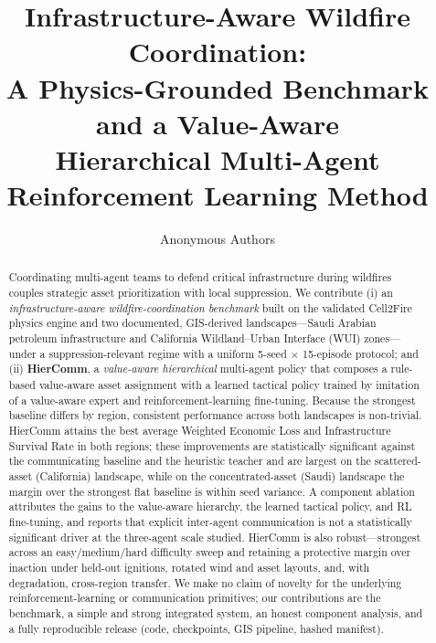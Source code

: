 \documentclass[letterpaper]{article}
\title{Infrastructure-Aware Wildfire Coordination: \\ A Physics-Grounded Benchmark and a Value-Aware \\ Hierarchical Multi-Agent Reinforcement Learning Method}
\author{Anonymous Authors}
\begin{document}
\maketitle

\begin{abstract}
Coordinating multi-agent teams to defend critical infrastructure during wildfires couples strategic asset prioritization with local suppression. We contribute (i) an \emph{infrastructure-aware wildfire-coordination benchmark} built on the validated Cell2Fire physics engine and two documented, GIS-derived landscapes---Saudi Arabian petroleum infrastructure and California Wildland--Urban Interface (WUI) zones---under a suppression-relevant regime with a uniform 5-seed $\times$ 15-episode protocol; and (ii) \textbf{HierComm}, a \emph{value-aware hierarchical} multi-agent policy that composes a rule-based value-aware asset assignment with a learned tactical policy trained by imitation of a value-aware expert and reinforcement-learning fine-tuning. Because the strongest baseline differs by region, consistent performance across both landscapes is non-trivial. HierComm attains the best average Weighted Economic Loss and Infrastructure Survival Rate in both regions; these improvements are statistically significant against the communicating baseline and the heuristic teacher and are largest on the scattered-asset (California) landscape, while on the concentrated-asset (Saudi) landscape the margin over the strongest flat baseline is within seed variance. A component ablation attributes the gains to the value-aware hierarchy, the learned tactical policy, and RL fine-tuning, and reports that explicit inter-agent communication is not a statistically significant driver at the three-agent scale studied. HierComm is also robust---strongest across an easy/medium/hard difficulty sweep and retaining a protective margin over inaction under held-out ignitions, rotated wind and asset layouts, and, with degradation, cross-region transfer. We make no claim of novelty for the underlying reinforcement-learning or communication primitives; our contributions are the benchmark, a simple and strong integrated system, an honest component analysis, and a fully reproducible release (code, checkpoints, GIS pipeline, hashed manifest).
\end{abstract}

\end{document}
